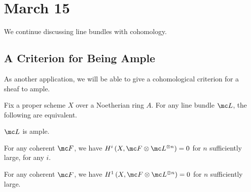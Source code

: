 \documentclass[../notes.tex]{subfiles}
\begin{document}
\section{March 15}

We continue discussing line bundles with cohomology.

\subsection{A Criterion for Being Ample}
As another application, we will be able to give a cohomological criterion for a sheaf to ample.
\begin{theorem}
	Fix a proper scheme $X$ over a Noetherian ring $A$. For any line bundle $\mc L$, the following are equivalent.
	\begin{listalph}
		\item $\mc L$ is ample.
		\item For any coherent $\mc F$, we have $H^i\left(X,\mc F\otimes\mc L^{\otimes n}\right)=0$ for $n$ sufficiently large, for any $i$.
		\item For any coherent $\mc F$, we have $H^1\left(X,\mc F\otimes\mc L^{\otimes n}\right)=0$ for $n$ sufficiently large.
	\end{listalph}
\end{theorem}
\end{document}

